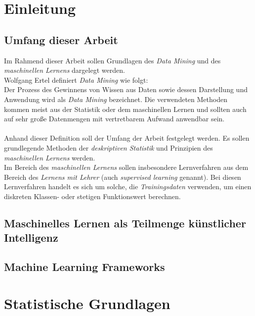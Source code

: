 \documentclass[a4paper]{scrartcl}
\begin{document}
    \begin{multicols}{2}
        \section{Einleitung}
            \subsection{Umfang dieser Arbeit}
                Im Rahmend dieser Arbeit sollen Grundlagen des \emph{Data Mining} und des \emph{maschinellen Lernens} dargelegt werden.\\
                Wolfgang Ertel definiert \emph{Data Mining} wie folgt:\\
                \glqq Der Prozess des Gewinnens von Wissen aus Daten sowie dessen Darstellung und Anwendung wird als \emph{Data Mining} bezeichnet. Die verwendeten Methoden kommen meist aus der Statistik oder dem maschinellen Lernen und sollten auch auf sehr große Datenmengen mit vertretbarem Aufwand anwendbar sein.\grqq \cite{ertel2016}
                \\
                \\
                Anhand dieser Definition soll der Umfang der Arbeit festgelegt werden. Es sollen grundlegende Methoden der \emph{deskriptiven Statistik} und Prinzipien des \emph{maschinellen Lernens} werden.\\
                Im Bereich des \emph{maschinellen Lernens} sollen insbesondere Lernverfahren aus dem Bereich des \emph{Lernens mit Lehrer} (auch \emph{supervised learning} genannt). Bei diesen Lernverfahren handelt es sich um solche, die \emph{Trainingsdaten} verwenden, um einen diskreten Klassen- oder stetigen Funktionswert berechnen.

            \subsection{Maschinelles Lernen als Teilmenge künstlicher Intelligenz}

            \subsection{Machine Learning Frameworks}

        \section{Statistische Grundlagen}
            

\end{multicols}
\end{document}
